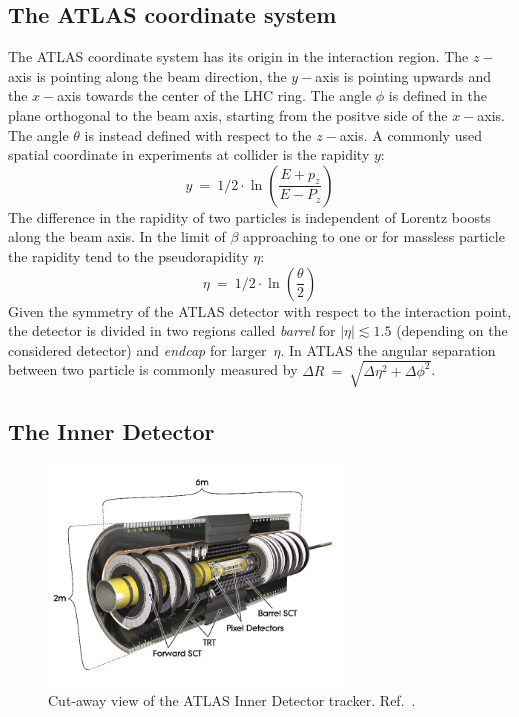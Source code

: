 \subsection{The ATLAS coordinate system}
The ATLAS coordinate system has its origin in the interaction region. The $z-$axis is pointing along the beam direction,
the $y-$axis is pointing upwards and the $x-$axis towards the center of the LHC ring. The angle $\phi$ is defined in the plane orthogonal
to the beam axis, starting from the positve side of the $x-$axis. The angle $\theta$ is instead defined with respect to the $z-$axis.
A commonly used spatial coordinate in  experiments at collider is the rapidity $y$:
\begin{equation}
y ~ = ~ 1/2 \cdot \ln \left( \frac{E + p_{z}}{E - P_z} \right) 
\end{equation}
The difference in the rapidity of two particles is independent of Lorentz boosts along the beam axis. In the limit of $\beta$ approaching to one 
or for massless particle the rapidity tend to the pseudorapidity $\eta$:
\begin{equation}
\eta ~ = ~ 1/2 \cdot \ln \left( \frac{\theta}{2} \right) 
\end{equation}
Given the symmetry of the ATLAS detector with respect to the interaction point, the detector is divided in two regions called \emph{barrel} 
for $|\eta| \apprle 1.5$ (depending on the considered detector) 
and \emph{endcap} for larger~$\eta$. In ATLAS the angular separation between two particle is commonly measured by 
$\Delta R ~=~\sqrt{\Delta \eta^2 + \Delta \phi^2}$. 

\subsection{The Inner Detector}

\begin{figure}[tp]
     \begin{center}

            \includegraphics[width=0.7\textwidth]{figure/Inner_detector.jpg}

    \end{center}
    \caption{Cut-away view of the ATLAS Inner Detector tracker. Ref.~\cite{ATLASDetector}.}

   \label{fig:atlasID}
\end{figure}


